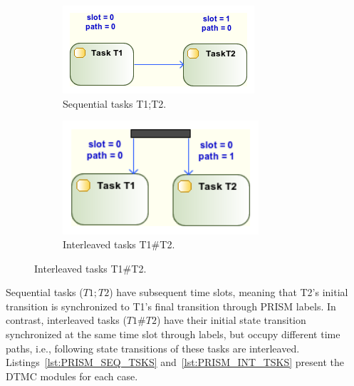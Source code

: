 \begin{figure}[ht!]
        \centering
        \begin{subfigure}[b]{0.4\textwidth}
                \includegraphics[width=\textwidth]{imgs/UML_SEQ_TSKS.png}
				\caption{Sequential tasks T1;T2.}
				\label{fig:UML_SEQ_TSKS}
        \end{subfigure}        
        \quad %
        \begin{subfigure}[b]{0.4\textwidth}                
                \includegraphics[width=0.8\textwidth]{imgs/UML_PAR_TSKS.png}
				\caption{Interleaved tasks T1\#T2.}
				\label{fig:UML_PAR_TSKS}
        \end{subfigure}%
          
\end{figure}

Sequential tasks ($T1;T2$) have subsequent time slots, meaning that T2's initial transition is synchronized to T1's final transition through PRISM labels. In contrast, interleaved tasks ($T1\#T2$) have their initial state transition synchronized at the same time slot through labels, but occupy different time paths, i.e., following state transitions of these tasks are interleaved.  Listings~\ref{lst:PRISM_SEQ_TSKS} and~\ref{lst:PRISM_INT_TSKS} present the DTMC modules for each case.
\medskip

